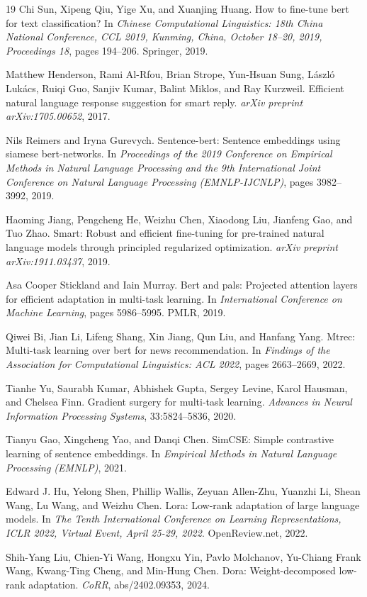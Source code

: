 \documentclass[11pt]{article}
\begin{document}
\begin{thebibliography}{19}
 Chi Sun, Xipeng Qiu, Yige Xu, and Xuanjing Huang. How to fine-tune bert for text classification? In \textit{Chinese Computational Linguistics: 18th China National Conference, CCL 2019, Kunming, China, October 18--20, 2019, Proceedings 18}, pages 194--206. Springer, 2019.

 Matthew Henderson, Rami Al-Rfou, Brian Strope, Yun-Hsuan Sung, László Lukács, Ruiqi Guo, Sanjiv Kumar, Balint Miklos, and Ray Kurzweil. Efficient natural language response suggestion for smart reply. \textit{arXiv preprint arXiv:1705.00652}, 2017.

 Nils Reimers and Iryna Gurevych. Sentence-bert: Sentence embeddings using siamese bert-networks. In \textit{Proceedings of the 2019 Conference on Empirical Methods in Natural Language Processing and the 9th International Joint Conference on Natural Language Processing (EMNLP-IJCNLP)}, pages 3982--3992, 2019.

 Haoming Jiang, Pengcheng He, Weizhu Chen, Xiaodong Liu, Jianfeng Gao, and Tuo Zhao. Smart: Robust and efficient fine-tuning for pre-trained natural language models through principled regularized optimization. \textit{arXiv preprint arXiv:1911.03437}, 2019.

 Asa Cooper Stickland and Iain Murray. Bert and pals: Projected attention layers for efficient adaptation in multi-task learning. In \textit{International Conference on Machine Learning}, pages 5986--5995. PMLR, 2019.

 Qiwei Bi, Jian Li, Lifeng Shang, Xin Jiang, Qun Liu, and Hanfang Yang. Mtrec: Multi-task learning over bert for news recommendation. In \textit{Findings of the Association for Computational Linguistics: ACL 2022}, pages 2663--2669, 2022.

 Tianhe Yu, Saurabh Kumar, Abhishek Gupta, Sergey Levine, Karol Hausman, and Chelsea Finn. Gradient surgery for multi-task learning. \textit{Advances in Neural Information Processing Systems}, 33:5824--5836, 2020.

 Tianyu Gao, Xingcheng Yao, and Danqi Chen. SimCSE: Simple contrastive learning of sentence embeddings. In \textit{Empirical Methods in Natural Language Processing (EMNLP)}, 2021.

 Edward J. Hu, Yelong Shen, Phillip Wallis, Zeyuan Allen-Zhu, Yuanzhi Li, Shean Wang, Lu Wang, and Weizhu Chen. Lora: Low-rank adaptation of large language models. In \textit{The Tenth International Conference on Learning Representations, ICLR 2022, Virtual Event, April 25-29, 2022}. OpenReview.net, 2022.

 Shih-Yang Liu, Chien-Yi Wang, Hongxu Yin, Pavlo Molchanov, Yu-Chiang Frank Wang, Kwang-Ting Cheng, and Min-Hung Chen. Dora: Weight-decomposed low-rank adaptation. \textit{CoRR}, abs/2402.09353, 2024.

\end{thebibliography}
\end{document}
